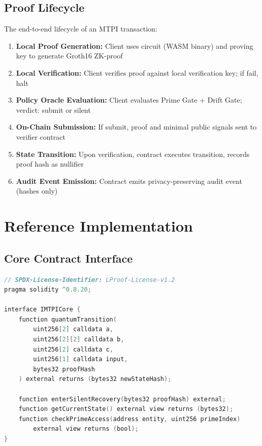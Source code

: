 \documentclass[11pt,a4paper]{article}
\begin{document}
\subsection{Proof Lifecycle}

The end-to-end lifecycle of an MTPI transaction:

\begin{enumerate}[noitemsep]
    \item \textbf{Local Proof Generation:} Client uses circuit (WASM binary) and proving key to generate Groth16 ZK-proof
    \item \textbf{Local Verification:} Client verifies proof against local verification key; if fail, halt
    \item \textbf{Policy Oracle Evaluation:} Client evaluates Prime Gate + Drift Gate; verdict: submit or silent
    \item \textbf{On-Chain Submission:} If submit, proof and minimal public signals sent to verifier contract
    \item \textbf{State Transition:} Upon verification, contract executes transition, records proof hash as nullifier
    \item \textbf{Audit Event Emission:} Contract emits privacy-preserving audit event (hashes only)
\end{enumerate}

\section{Reference Implementation}

\subsection{Core Contract Interface}

\begin{lstlisting}[language=C,caption={IMTPICore Interface (Solidity)}]
// SPDX-License-Identifier: LProof-License-v1.2
pragma solidity ^0.8.20;

interface IMTPICore {
    function quantumTransition(
        uint256[2] calldata a,
        uint256[2][2] calldata b,
        uint256[2] calldata c,
        uint256[1] calldata input,
        bytes32 proofHash
    ) external returns (bytes32 newStateHash);

    function enterSilentRecovery(bytes32 proofHash) external;
    function getCurrentState() external view returns (bytes32);
    function checkPrimeAccess(address entity, uint256 primeIndex) 
        external view returns (bool);
}
\end{lstlisting}
\end{document}
